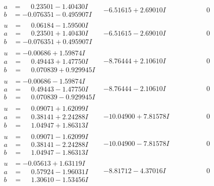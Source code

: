 \documentclass[1p]{elsarticle_modified}
\theoremstyle{definition}
\begin{document}
$$\begin{array}{c|c|c}
\begin{aligned}
a &= \phantom{-}0.23501 - 1.40430 I \\
b &= -0.076351 - 0.495907 I\end{aligned}
 & -6.51615 + 2.69010 I & \phantom{-0.000000 } 0 \\ \hline\begin{aligned}
u &= \phantom{-}0.06184 - 1.59500 I \\
a &= \phantom{-}0.23501 + 1.40430 I \\
b &= -0.076351 + 0.495907 I\end{aligned}
 & -6.51615 - 2.69010 I & \phantom{-0.000000 } 0 \\ \hline\begin{aligned}
u &= -0.00686 + 1.59874 I \\
a &= \phantom{-}0.49443 + 1.47750 I \\
b &= \phantom{-}0.070839 + 0.929945 I\end{aligned}
 & -8.76444 + 2.10610 I & \phantom{-0.000000 } 0 \\ \hline\begin{aligned}
u &= -0.00686 - 1.59874 I \\
a &= \phantom{-}0.49443 - 1.47750 I \\
b &= \phantom{-}0.070839 - 0.929945 I\end{aligned}
 & -8.76444 - 2.10610 I & \phantom{-0.000000 } 0 \\ \hline\begin{aligned}
u &= \phantom{-}0.09071 + 1.62099 I \\
a &= \phantom{-}0.38141 + 2.24288 I \\
b &= \phantom{-}1.04947 + 1.86313 I\end{aligned}
 & -10.04900 + 7.81578 I & \phantom{-0.000000 } 0 \\ \hline\begin{aligned}
u &= \phantom{-}0.09071 - 1.62099 I \\
a &= \phantom{-}0.38141 - 2.24288 I \\
b &= \phantom{-}1.04947 - 1.86313 I\end{aligned}
 & -10.04900 - 7.81578 I & \phantom{-0.000000 } 0 \\ \hline\begin{aligned}
u &= -0.05613 + 1.63119 I \\
a &= \phantom{-}0.57924 - 1.96031 I \\
b &= \phantom{-}1.30610 - 1.53456 I\end{aligned}
 & -8.81712 - 4.37016 I & \phantom{-0.000000 } 0 \\ \hline\begin{aligned}

\end{aligned}
\end{array}$$
\end{document}
